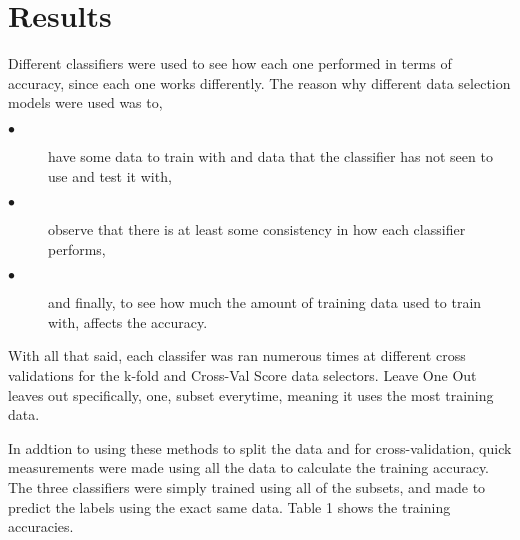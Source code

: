 \documentclass[conference,compsoc]{IEEEtran}
\begin{document}
\section{Results}
Different classifiers were used to see how each one performed in terms of accuracy, since each one works differently. The reason why different data selection models 
were used was to,
\begin{description}
	\item[$\bullet$] have some data to train with and data that the classifier has not seen to use and test it with,
	\item[$\bullet$] observe that there is at least some consistency in how each classifier performs,
	\item[$\bullet$] and finally, to see how much the amount of training data used to train with, affects the accuracy.
\end{description}
\noindent With all that said, each classifer was ran numerous times at different cross validations for the k-fold and Cross-Val Score data selectors. Leave One Out leaves out specifically, one, subset everytime, meaning it uses the most training data.

In addtion to using these methods to split the data and for cross-validation, quick measurements were made using all the data to calculate the training accuracy. The three classifiers were simply trained using all of the subsets, and made to predict the labels using the exact same data. Table 1 shows the training accuracies.

\begin{table}[h]
	\caption{Training Accuracies}
	\label{table1}
\noindent{}	

\end{table}
\end{document}
